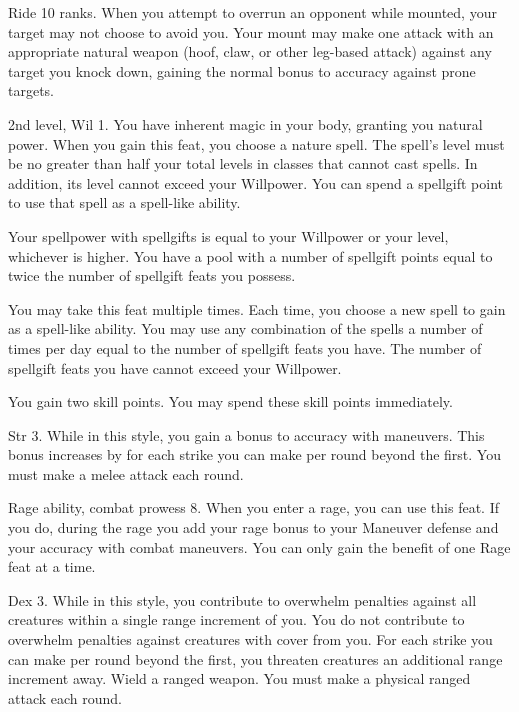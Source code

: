 \featpre Ride 10 ranks.
\featben When you attempt to overrun an opponent while mounted, your target may not choose to avoid you.
Your mount may make one attack with an appropriate natural weapon (hoof, claw, or other leg-based attack) against any target you knock down, gaining the normal  bonus to accuracy against prone targets.

\featpres 2nd level, Wil 1.
\featben You have inherent magic in your body, granting you natural power.
When you gain this feat, you choose a nature spell.
The spell's level must be no greater than half your total levels in classes that cannot cast spells.
In addition, its level cannot exceed your Willpower.
You can spend a spellgift point to use that spell as a spell-like ability.

Your spellpower with spellgifts is equal to your Willpower or your level, whichever is higher.
You have a pool with a number of spellgift points equal to twice the number of spellgift feats you possess.

You may take this feat multiple times.
Each time, you choose a new spell to gain as a spell-like ability.
You may use any combination of the spells a number of times per day equal to the number of spellgift feats you have.
The number of spellgift feats you have cannot exceed your Willpower.

\featben You gain two skill points.
You may spend these skill points immediately.

\featpre Str 3.
\featben While in this style, you gain a  bonus to accuracy with maneuvers.
This bonus increases by  for each strike you can make per round beyond the first.
\stylereq You must make a melee attack each round.

\featpres Rage ability, combat prowess 8.
\featben When you enter a rage, you can use this feat. If you do, during the rage you add your rage bonus to your Maneuver defense and your accuracy with combat maneuvers.
 You can only gain the benefit of one Rage feat at a time.

\featpre Dex 3.
\featben While in this style, you contribute to overwhelm penalties against all creatures within a single range increment of you.
You do not contribute to overwhelm penalties against creatures with cover from you.
For each strike you can make per round beyond the first, you threaten creatures an additional range increment away.
\stylereq Wield a ranged weapon.
You must make a physical ranged attack each round.

